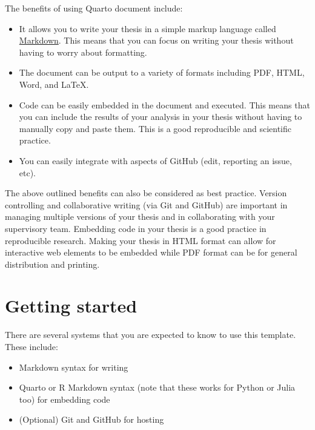 \documentclass[
  a4paper,
  oneside,
  openany,
  12pt,
  onecolumn]{book}
\providecommand{\tightlist}{%
  \setlength{\itemsep}{0pt}\setlength{\parskip}{0pt}}\usepackage{longtable,booktabs,array}
\theoremstyle{definition}
\theoremstyle{plain}
\theoremstyle{remark}
\begin{document}

The benefits of using Quarto document include:

\begin{itemize}
\tightlist
\item
  It allows you to write your thesis in a simple markup language called
  \href{https://www.markdownguide.org/}{Markdown}. This means that you
  can focus on writing your thesis without having to worry about
  formatting.
\item
  The document can be output to a variety of formats including PDF,
  HTML, Word, and LaTeX.
\item
  Code can be easily embedded in the document and executed. This means
  that you can include the results of your analysis in your thesis
  without having to manually copy and paste them. This is a good
  reproducible and scientific practice.
\item
  You can easily integrate with aspects of GitHub (edit, reporting an
  issue, etc).
\end{itemize}

The above outlined benefits can also be considered as best practice.
Version controlling and collaborative writing (via Git and GitHub) are
important in managing multiple versions of your thesis and in
collaborating with your supervisory team. Embedding code in your thesis
is a good practice in reproducible research. Making your thesis in HTML
format can allow for interactive web elements to be embedded while PDF
format can be for general distribution and printing.

\section*{Getting started}\label{getting-started}


There are several systems that you are expected to know to use this
template. These include:

\begin{itemize}
\tightlist
\item
  Markdown syntax for writing
\item
  Quarto or R Markdown syntax (note that these works for Python or Julia
  too) for embedding code
\item
  (Optional) Git and GitHub for hosting
\end{itemize}
\end{document}

